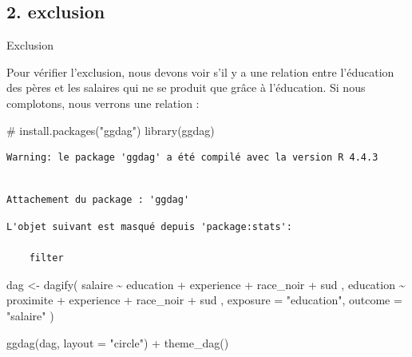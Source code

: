 \documentclass[
  letterpaper,
  DIV=11,
  numbers=noendperiod]{scrartcl}
\newenvironment{Shaded}{\begin{snugshade}}{\end{snugshade}}
\newcommand{\AttributeTok}[1]{\textcolor[rgb]{0.40,0.45,0.13}{#1}}
\newcommand{\CommentTok}[1]{\textcolor[rgb]{0.37,0.37,0.37}{#1}}
\newcommand{\FunctionTok}[1]{\textcolor[rgb]{0.28,0.35,0.67}{#1}}
\newcommand{\NormalTok}[1]{\textcolor[rgb]{0.00,0.23,0.31}{#1}}
\newcommand{\OtherTok}[1]{\textcolor[rgb]{0.00,0.23,0.31}{#1}}
\newcommand{\SpecialCharTok}[1]{\textcolor[rgb]{0.37,0.37,0.37}{#1}}
\newcommand{\StringTok}[1]{\textcolor[rgb]{0.13,0.47,0.30}{#1}}
\begin{document}
\subsection{2. exclusion}\label{exclusion}

Exclusion

Pour vérifier l'exclusion, nous devons voir s'il y a une relation entre
l'éducation des pères et les salaires qui ne se produit que grâce à
l'éducation. Si nous complotons, nous verrons une relation :

\begin{Shaded}
\begin{Highlighting}[]
\CommentTok{\# install.packages("ggdag")}
\FunctionTok{library}\NormalTok{(ggdag)}
\end{Highlighting}
\end{Shaded}

\begin{verbatim}
Warning: le package 'ggdag' a été compilé avec la version R 4.4.3
\end{verbatim}

\begin{verbatim}

Attachement du package : 'ggdag'
\end{verbatim}

\begin{verbatim}
L'objet suivant est masqué depuis 'package:stats':

    filter
\end{verbatim}

\begin{Shaded}
\begin{Highlighting}[]
\NormalTok{dag }\OtherTok{\textless{}{-}} \FunctionTok{dagify}\NormalTok{(}
\NormalTok{  salaire }\SpecialCharTok{\textasciitilde{}}\NormalTok{ education }\SpecialCharTok{+}\NormalTok{ experience }\SpecialCharTok{+}\NormalTok{ race\_noir }\SpecialCharTok{+}\NormalTok{ sud ,}
\NormalTok{  education }\SpecialCharTok{\textasciitilde{}}\NormalTok{ proximite }\SpecialCharTok{+}\NormalTok{ experience }\SpecialCharTok{+}\NormalTok{ race\_noir }\SpecialCharTok{+}\NormalTok{ sud ,}
  \AttributeTok{exposure =} \StringTok{"education"}\NormalTok{,}
  \AttributeTok{outcome =} \StringTok{"salaire"}
\NormalTok{)}

\FunctionTok{ggdag}\NormalTok{(dag, }\AttributeTok{layout =} \StringTok{"circle"}\NormalTok{) }\SpecialCharTok{+}
  \FunctionTok{theme\_dag}\NormalTok{()}
\end{Highlighting}
\end{Shaded}
\end{document}
